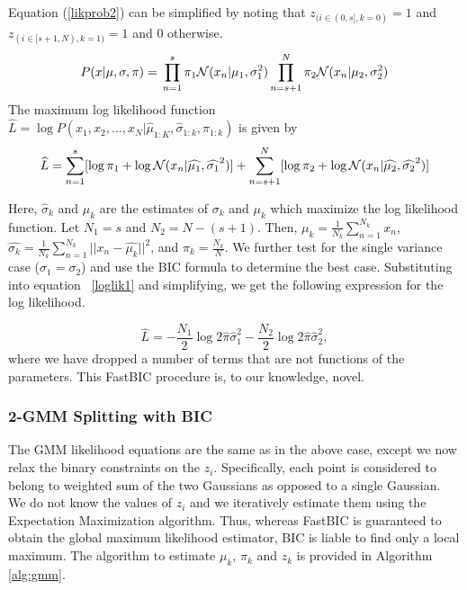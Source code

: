 Equation (\ref{likprob2}) can be simplified by noting that  $z_{(i \in (0, s], k = 0)} = 1$  and $z_{(i \in [s+1, N), k = 1)} = 1$ and 0 otherwise.
\begin{equation}
    P(x | \mu, \sigma, \pi) = \\ \prod_{n=1}^{s}\pi_1 \mathcal{N}(x_n | \mu_1, \sigma_1^2) \prod_{n=s+1}^{N}\pi_2 \mathcal{N}(x_n | \mu_2, \sigma_2^2)
\end{equation}
The maximum log likelihood function \\ $\hat{L} =\log P(x_1, x_2, ..., x_N | \hat{\mu}_{1:K}, \hat{\sigma}_{1:k}, \hat{\pi}_{1:k})$ is given by
\begin{equation}\label{loglik1}
   \hat{L} = \sum_{n=1}^{s} [\log \pi_1 + \log \mathcal{N}(x_{n} | \hat{\mu_1}, \hat{\sigma_{1}}^2)] \\+
   \sum_{n=s+1}^{N} [\log \pi_2 + \log \mathcal{N}(x_{n} | \hat{\mu_2}, \hat{\sigma_{2}}^2)]
\end{equation}

Here, $\hat{\sigma}_{k}$ and $\hat{\mu}_{k}$ are the estimates of $\sigma_k$ and $\mu_k$ which maximize the log likelihood function. Let $N_1 = s$ and $N_2 = N-(s+1)$. Then, $\mu_k = \frac{1}{N_k}\sum_{n=1}^{N_k} x_n$,  $\hat{\sigma_k} = \frac{1}{N_k}\sum_{n=1}^{N_k}||x_{n} - \hat{\mu_k}||^2$, and $\hat{\pi}_k = \frac{N_k}{N}$. We further test for the single variance case ($\sigma_1 = \sigma_2$) and use the BIC formula to determine the best case. Substituting into equation ~\ref{loglik1} and simplifying, we get the following expression for the log likelihood.

\begin{equation}\label{eq3}
    \hat{L} =   - \frac{N_1}{2}\log 2\hat{\pi} \hat{\sigma}_1^2    - \frac{N_2}{2}\log 2\hat{\pi} \hat{\sigma}_2^2, 
\end{equation}
where we have dropped a number of terms that are not functions of the parameters. This FastBIC procedure is, to our knowledge, novel.
 

\subsubsection{2-GMM Splitting with BIC}
 
The GMM likelihood equations are the same as in the above case, except we now relax the binary constraints on the $z_i$.  Specifically, each point is considered to belong to weighted sum of the two Gaussians as opposed to a single Gaussian. We do not know the values of $z_i$ and we iteratively estimate them using the Expectation Maximization algorithm. Thus, whereas  FastBIC is guaranteed to obtain the global maximum likelihood estimator, BIC is liable to find only a local maximum. The algorithm to estimate $\mu_k$, $\pi_k$ and $z_k$ is provided in Algorithm \ref{alg:gmm}.


